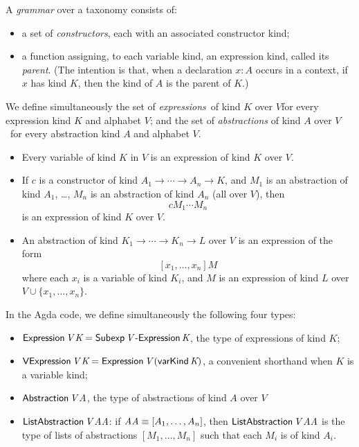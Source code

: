 \documentclass[envcountsame]{llncs}
\begin{document}
A \emph{grammar} over a taxonomy consists of:
\begin{itemize}
\item
a set of \emph{constructors}, each with an associated constructor kind;
\item
a function assigning, to each variable kind, an expression kind, called its \emph{parent}.  (The intention is that, when a declaration $x : A$ occurs in a context, if $x$ has kind $K$, then the kind of $A$ is the parent of $K$.)
\end{itemize}


\begin{definition}
 We define simultaneously the set of \emph{expressions} of kind $K$ over $V$for every expression kind $K$ and
alphabet $V$;
and the set of \emph{abstractions} of kind $A$ over $V$ for every abstraction kind $A$ and alphabet
$V$.
\begin{itemize}
\item Every variable of kind $K$ in $V$ is an expression of kind $K$ over $V$.
\item If $c$ is a constructor of kind $A_1 \rightarrow \cdots \rightarrow A_n \rightarrow K$,
and $M_1$ is an abstraction of kind $A_1$, \ldots, $M_n$ is an abstraction of kind $A_n$ (all over $V$), then
$$ c M_1 \cdots M_n $$
is an expression of kind $K$ over $V$.
\item
An abstraction of kind $K_1 \rightarrow \cdots \rightarrow K_n \rightarrow L$ over $V$ is
an expression of the form
\[ [x_1, \ldots, x_n] M \]
where each $x_i$ is a variable of kind $K_i$, and $M$ is an expression of kind $L$ over
$V \cup \{ x_1, \ldots, x_n \}$.
\end{itemize}
\end{definition}

In the Agda code, we define simultaneously the following four types:
\begin{itemize}
 \item $\AgdaFunction{Expression} \, \AgdaBound{V} \, \AgdaBound{K} = \AgdaDatatype{Subexp} \, \AgdaBound{V} \, \AgdaInductiveConstructor{-Expression} \, \AgdaBound{K}$,
the type of expressions of kind $K$;
\item $\AgdaFunction{VExpression} \, \AgdaBound{V} \, \AgdaBound{K} = \AgdaFunction{Expression} \,
\AgdaBound{V} \, (\AgdaInductiveConstructor{varKind} \, \AgdaBound{K})$, a convenient
shorthand when $K$ is a variable kind;
\item $\AgdaFunction{Abstraction} \, \AgdaBound{V} \, \AgdaBound{A}$, the type of abstractions
of kind $A$ over $V$
\item $\AgdaFunction{ListAbstraction} \, \AgdaBound{V} \, \AgdaBound{AA}$: if $\AgdaBound{AA} \equiv [ A_1, \ldots, A_n ]$,
then $\AgdaFunction{ListAbstraction} \, \AgdaBound{V} \, \AgdaBound{AA}$ is the type of lists of abstractions $[M_1, \ldots, M_n]$
such that each $M_i$ is of kind $A_i$.
\end{itemize}
\end{document}
